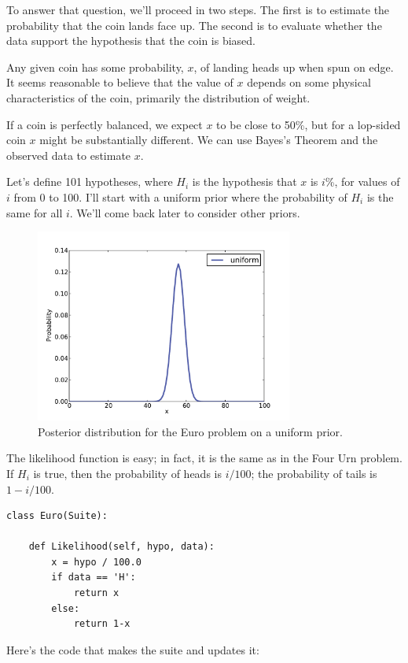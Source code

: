 \documentclass[12pt]{book}
\begin{document}
To answer that question, we'll proceed in two steps.  The first
is to estimate the probability that the coin lands face up.  The second
is to evaluate whether the data support the hypothesis that the
coin is biased.

Any given coin has some probability, $x$, of landing heads up when spun
on edge.  It seems reasonable to believe that the value of $x$ depends
on some physical characteristics of the coin, primarily the distribution
of weight.

If a coin is perfectly balanced, we expect $x$ to be close to 50\%, but
for a lop-sided coin $x$ might be substantially different.  We can use
Bayes's Theorem and the observed data to estimate $x$.

Let's define 101 hypotheses, where $H_i$ is the hypothesis that
$x$ is $i$\%, for values of $i$ from 0 to 100.  I'll start with a uniform
prior where the probability of $H_i$ is the same for all $i$.  We'll
come back later to consider other priors.

\begin{figure}
\centerline{\includegraphics[height=2.5in]{figs/euro1.pdf}}
\caption{Posterior distribution for the Euro problem
on a uniform prior.}
\label{fig.euro1}
\end{figure}

The likelihood function is easy; in fact, it is the same as in
the Four Urn problem.  If $H_i$ is true, then the probability of
heads is $i/100$; the probability of tails is $1- i/100$.

\begin{verbatim}
class Euro(Suite):

    def Likelihood(self, hypo, data):
        x = hypo / 100.0
        if data == 'H':
            return x
        else:
            return 1-x
\end{verbatim}

Here's the code that makes the suite and updates it:
\end{document}
